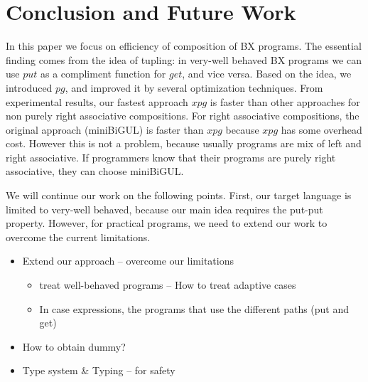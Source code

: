 \section{Conclusion and Future Work}

In this paper we focus on efficiency of composition of BX programs.
The essential finding comes from the idea of tupling: in very-well behaved BX programs we can use $put$ as a compliment function for $get$, and vice versa.
Based on the idea, we introduced $pg$, and improved it by several optimization techniques. From experimental results, our fastest approach $xpg$ is faster than other approaches for non purely right associative compositions. For right associative compositions, the original approach (miniBiGUL) is faster than $xpg$ because $xpg$ has some overhead cost. However this is not a problem, because usually programs are mix of left and right associative. If programmers know that their programs are purely right associative, they can choose miniBiGUL.

We will continue our work on the following points. First, our target language is limited to very-well behaved, because our main idea requires the put-put property. However, for practical programs, we need to extend our work to overcome the current limitations.

\begin{itemize}
\item Extend our approach -- overcome our limitations
  \begin{itemize}
  \item treat well-behaved programs -- How to treat adaptive cases
  \item In case expressions, the programs that use the different paths (put and get)
  \end{itemize}
\item How to obtain dummy?
\item Type system \& Typing -- for safety
\end{itemize}
